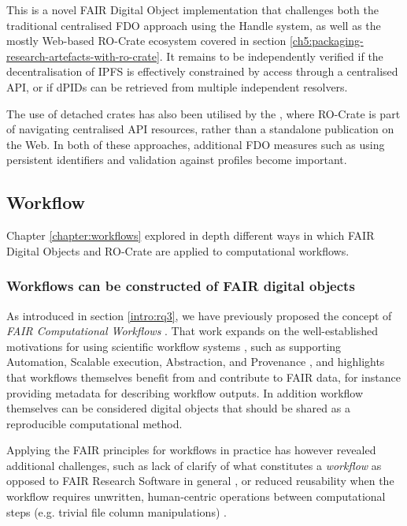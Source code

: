This is a novel FAIR Digital Object implementation that challenges both the traditional centralised FDO approach using the Handle system, as well as the mostly Web-based RO-Crate ecosystem covered in section \vref{ch5:packaging-research-artefacts-with-ro-crate}. It remains to be independently verified if the decentralisation of IPFS is effectively constrained by access through a centralised API, or if dPIDs can be retrieved from multiple independent resolvers.

The use of detached crates has also been utilised by the , where RO-Crate is part of navigating centralised API resources, rather than a standalone publication on the Web. In both of these approaches, additional FDO measures such as using persistent identifiers and validation against profiles become important. 


\subsection{Workflow}
\label{ch61:workflow}

Chapter \vref{chapter:workflows} explored in depth different ways in which FAIR Digital Objects and RO-Crate are applied to computational workflows. 

\subsubsection{Workflows can be constructed of FAIR digital objects}
\label{ch61:workflowfdo}

As introduced in section \vref{intro:rq3}, we have previously proposed the concept of \emph{FAIR Computational Workflows} \cite{Goble 2020}. 
That work expands on the well-established motivations for using scientific workflow systems \cite{ch6-4,Atkinson 2017}, such as supporting Automation, Scalable execution, Abstraction, and Provenance \cite{Ludascher 2016}, and highlights that workflows themselves benefit from and contribute to FAIR data, for instance providing metadata for describing workflow outputs. 
In addition workflow themselves can be considered digital objects that should be shared as a reproducible computational method.

Applying the FAIR principles for workflows in practice has however revealed additional challenges, such as lack of clarify of what constitutes a \emph{workflow} as opposed to FAIR Research Software in general \cite{Katz 2021b}, or reduced reusability when the workflow requires unwritten, human-centric operations between computational steps (e.g. trivial file column manipulations) \cite{wilkinsonWorkflowsWhenParts2022b}. 

